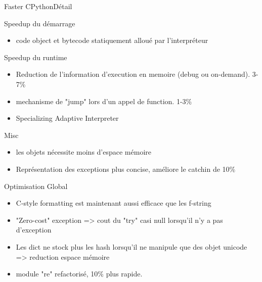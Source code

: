 \documentclass[aspectratio=169, xetex, 12pt]{beamer}
\begin{document}
    \begin{frame}{Faster CPython}{Détail}

        \begin{block}{Speedup du démarrage}
            \begin{itemize}
                \item code object et bytecode statiquement alloué par l'interpréteur
            \end{itemize}
        \end{block}

        \begin{block}{Speedup du runtime}
            \begin{itemize}
                \item Reduction de l'information d'execution en memoire (debug ou on-demand). 3-7\%
                \item mechanisme de "jump" lors d'un appel de function. 1-3\%
                \item  Specializing Adaptive Interpreter
            \end{itemize}
        \end{block}
        \begin{block}{Misc}
            \begin{itemize}
                \item les objets nécessite moins d'espace mémoire
                \item Représentation des exceptions plus concise, améliore le catchin de 10\%
            \end{itemize}
        \end{block}
    \end{frame}

    \begin{frame}{Optimisation Global}
        \begin{block}{}
            \begin{itemize}
                \item C-style formatting est maintenant aussi efficace que les f-string
                \item "Zero-cost" exception => cout du "try" casi null lorsqu'il n'y a pas d'exception
                \item Les dict ne stock plus les hash lorsqu'il ne manipule que des objet unicode => reduction espace mémoire
                \item module "re" refactorisé, 10\% plus rapide.
            \end{itemize}
        \end{block}
    \end{frame}
\end{document}
